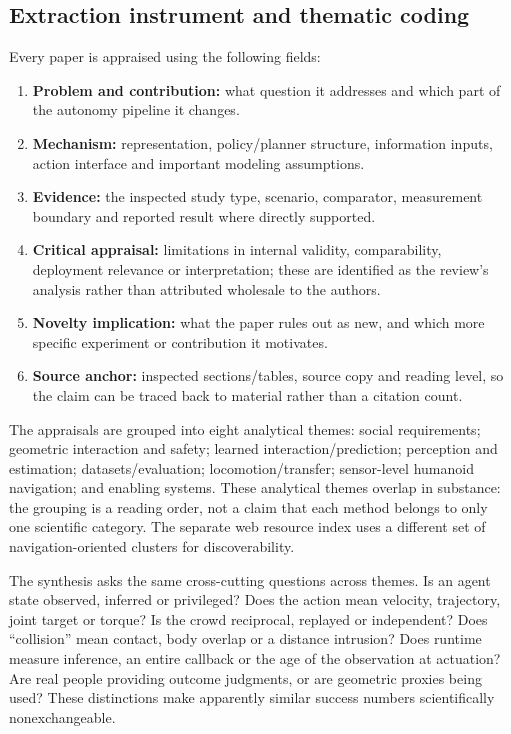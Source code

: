 \subsection{Extraction instrument and thematic coding}
Every paper is appraised using the following fields:
\begin{enumerate}
\item \textbf{Problem and contribution:} what question it addresses and which
part of the autonomy pipeline it changes.
\item \textbf{Mechanism:} representation, policy/planner structure, information
inputs, action interface and important modeling assumptions.
\item \textbf{Evidence:} the inspected study type, scenario, comparator,
measurement boundary and reported result where directly supported.
\item \textbf{Critical appraisal:} limitations in internal validity,
comparability, deployment relevance or interpretation; these are identified as
the review's analysis rather than attributed wholesale to the authors.
\item \textbf{Novelty implication:} what the paper rules out as new, and which
more specific experiment or contribution it motivates.
\item \textbf{Source anchor:} inspected sections/tables, source copy and reading
level, so the claim can be traced back to material rather than a citation count.
\end{enumerate}
The appraisals are grouped into eight analytical themes: social requirements;
geometric interaction and safety; learned interaction/prediction; perception and
estimation; datasets/evaluation; locomotion/transfer; sensor-level humanoid
navigation; and enabling systems. These analytical themes overlap in substance:
the grouping is a reading order, not a claim that each method belongs to only one
scientific category. The separate web resource index uses a different set of
navigation-oriented clusters for discoverability.

The synthesis asks the same cross-cutting questions across themes. Is an agent
state observed, inferred or privileged? Does the action mean velocity, trajectory,
joint target or torque? Is the crowd reciprocal, replayed or independent? Does
``collision'' mean contact, body overlap or a distance intrusion? Does runtime
measure inference, an entire callback or the age of the observation at actuation?
Are real people providing outcome judgments, or are geometric proxies being used?
These distinctions make apparently similar success numbers scientifically
nonexchangeable.

